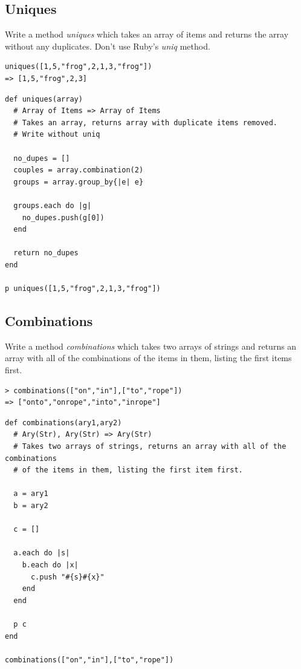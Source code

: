\documentclass[11pt]{article}
\begin{document}
\subsection{Uniques}
\label{sec-1-3}

Write a method \emph{uniques} which takes an array of items and returns the array
without any duplicates. Don't use Ruby's \emph{uniq} method.

\begin{verbatim}
uniques([1,5,"frog",2,1,3,"frog"])
=> [1,5,"frog",2,3]
\end{verbatim}

\begin{verbatim}
def uniques(array)
  # Array of Items => Array of Items
  # Takes an array, returns array with duplicate items removed.
  # Write without uniq

  no_dupes = []
  couples = array.combination(2)
  groups = array.group_by{|e| e}

  groups.each do |g|
    no_dupes.push(g[0])
  end

  return no_dupes
end

p uniques([1,5,"frog",2,1,3,"frog"])
\end{verbatim}

\subsection{Combinations}
\label{sec-1-4}

Write a method \emph{combinations} which takes two arrays of strings and returns
an array with all of the combinations of the items in them, listing the first
items first.

\begin{verbatim}
> combinations(["on","in"],["to","rope"])
=> ["onto","onrope","into","inrope"]
\end{verbatim}

\begin{verbatim}
def combinations(ary1,ary2)
  # Ary(Str), Ary(Str) => Ary(Str)
  # Takes two arrays of strings, returns an array with all of the combinations
  # of the items in them, listing the first item first.

  a = ary1
  b = ary2

  c = []

  a.each do |s|
    b.each do |x|
      c.push "#{s}#{x}"
    end
  end

  p c
end

combinations(["on","in"],["to","rope"])
\end{verbatim}
\end{document}
